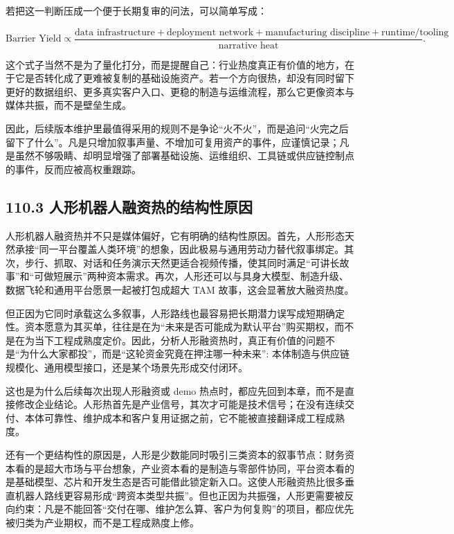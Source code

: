 若把这一判断压成一个便于长期复审的问法，可以简单写成：

\begingroup
\scriptsize
\begin{equation*}
\text{Barrier Yield} \propto
\frac{\text{data infrastructure} + \text{deployment network} + \text{manufacturing discipline} + \text{runtime/tooling}}
{\text{narrative heat}}.
\end{equation*}
\endgroup

这个式子当然不是为了量化打分，而是提醒自己：行业热度真正有价值的地方，在于它是否转化成了更难被复制的基础设施资产。若一个方向很热，却没有同时留下更好的数据组织、更多真实客户入口、更稳的制造与运维流程，那么它更像资本与媒体共振，而不是壁垒生成。

因此，后续版本维护里最值得采用的规则不是争论“火不火”，而是追问“火完之后留下了什么”。凡是只增加叙事声量、不增加可复用资产的事件，应谨慎记录；凡是虽然不够吸睛、却明显增强了部署基础设施、运维组织、工具链或供应链控制点的事件，反而应被高权重跟踪。

\subsection*{110.3 人形机器人融资热的结构性原因}


人形机器人融资热并不只是媒体偏好，它有明确的结构性原因。首先，人形形态天然承接“同一平台覆盖人类环境”的想象，因此极易与通用劳动力替代叙事绑定。其次，步行、抓取、对话和任务演示天然更适合视频传播，使其同时满足“可讲长故事”和“可做短展示”两种资本需求。再次，人形还可以与具身大模型、制造升级、数据飞轮和通用平台愿景一起被打包成超大 TAM 故事，这会显著放大融资热度。

但正因为它同时承载这么多叙事，人形路线也最容易把长期潜力误写成短期确定性。资本愿意为其买单，往往是在为“未来是否可能成为默认平台”购买期权，而不是在为当下工程成熟度定价。因此，分析人形融资热时，真正有价值的问题不是“为什么大家都投”，而是“这轮资金究竟在押注哪一种未来”: 本体制造与供应链规模化、通用模型接口，还是某个场景先形成交付闭环。

这也是为什么后续每次出现人形融资或 demo 热点时，都应先回到本章，而不是直接修改企业结论。人形热首先是产业信号，其次才可能是技术信号；在没有连续交付、本体可靠性、维护成本和客户复用证据之前，它不能被直接翻译成工程成熟度。

还有一个更结构性的原因是，人形是少数能同时吸引三类资本的叙事节点：财务资本看的是超大市场与平台想象，产业资本看的是制造与零部件协同，平台资本看的是基础模型、芯片和开发生态是否可能借此锁定新入口。这使人形融资热比很多垂直机器人路线更容易形成“跨资本类型共振”。但也正因为共振强，人形更需要被反向约束：凡是不能回答“交付在哪、维护怎么算、客户为何复购”的项目，都应优先被归类为产业期权，而不是工程成熟度上修。

